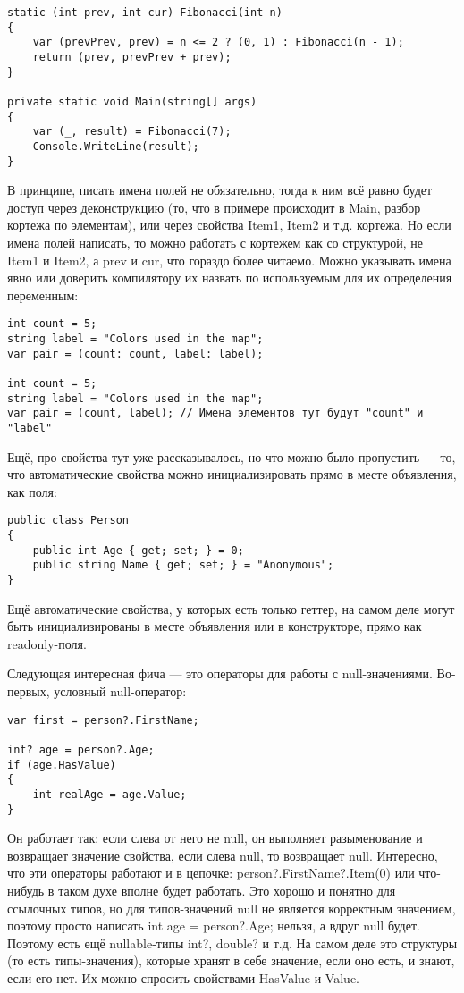 \documentclass{../../text-style}
\begin{document}
\begin{verbatim}
static (int prev, int cur) Fibonacci(int n)
{
    var (prevPrev, prev) = n <= 2 ? (0, 1) : Fibonacci(n - 1);
    return (prev, prevPrev + prev);
}

private static void Main(string[] args)
{
    var (_, result) = Fibonacci(7);
    Console.WriteLine(result);
}
\end{verbatim}

В принципе, писать имена полей не обязательно, тогда к ним всё равно будет доступ через деконструкцию (то, что в примере происходит в Main, разбор кортежа по элементам), или через свойства Item1, Item2 и т.д. кортежа. Но если имена полей написать, то можно работать с кортежем как со структурой, не Item1 и Item2, а prev и cur, что гораздо более читаемо. Можно указывать имена явно или доверить компилятору их назвать по используемым для их определения переменным:

\begin{verbatim}
int count = 5;
string label = "Colors used in the map";
var pair = (count: count, label: label);

int count = 5;
string label = "Colors used in the map";
var pair = (count, label); // Имена элементов тут будут "count" и "label"
\end{verbatim}

Ещё, про свойства тут уже рассказывалось, но что можно было пропустить --- то, что автоматические свойства можно инициализировать прямо в месте объявления, как поля:

\begin{verbatim}
public class Person
{
    public int Age { get; set; } = 0;
    public string Name { get; set; } = "Anonymous";
}
\end{verbatim}

Ещё автоматические свойства, у которых есть только геттер, на самом деле могут быть инициализированы в месте объявления или в конструкторе, прямо как readonly-поля.

Следующая интересная фича --- это операторы для работы с null-значениями. Во-первых, условный null-оператор:

\begin{verbatim}
var first = person?.FirstName;

int? age = person?.Age;
if (age.HasValue)
{
    int realAge = age.Value;
}
\end{verbatim}

Он работает так: если слева от него не null, он выполняет разыменование и возвращает значение свойства, если слева null, то возвращает null. Интересно, что эти операторы работают и в цепочке: person?.FirstName?.Item(0) или что-нибудь в таком духе вполне будет работать. Это хорошо и понятно для ссылочных типов, но для типов-значений null не является корректным значением, поэтому просто написать int age = person?.Age; нельзя, а вдруг null будет. Поэтому есть ещё nullable-типы int?, double? и т.д. На самом деле это структуры (то есть типы-значения), которые хранят в себе значение, если оно есть, и знают, если его нет. Их можно спросить свойствами HasValue и Value.
\end{document}
